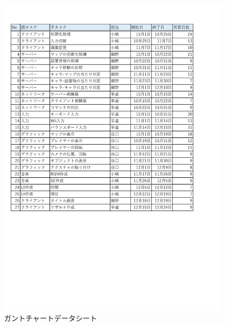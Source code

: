 \documentclass{jarticle}
\begin{document}
\begin{figure}[H]
    \centering
    \label{table:gunt1}
    \caption{ガントチャートデータシート}
    \includegraphics[scale=0.5]{guntdat.pdf}
\end{figure}
\end{document}
